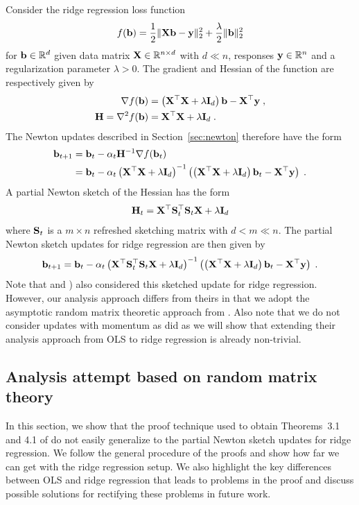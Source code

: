 Consider the ridge regression loss function
\[
f(\mathbf{b}) = \frac{1}{2}\|\mathbf{X}\mathbf{b}-\mathbf{y}\|_2^2 + \frac{\lambda}{2}\|\mathbf{b}\|_2^2
\]
for $\mathbf{b}\in\mathbb{R}^d$ given data matrix $\mathbf{X}\in\mathbb{R}^{n\times d}$ with $d\ll n$, responses $\mathbf{y}\in\mathbb{R}^n$ and a regularization parameter $\lambda>0$. The gradient and Hessian of the function are respectively given by
\begin{align*}
\nabla f(\mathbf{b}) &= \left(\mathbf{X}^\top\mathbf{X}+\lambda\mathbf{I}_d\right)\mathbf{b} - \mathbf{X}^\top\mathbf{y} \;, \\
\mathbf{H} = \nabla^2f(\mathbf{b}) &= \mathbf{X}^\top\mathbf{X}+\lambda\mathbf{I}_d \;.
\end{align*}
The Newton updates described in Section~\ref{sec:newton} therefore have the form
\begin{align*}
\mathbf{b}_{t+1} &= \mathbf{b}_t - \alpha_t\mathbf{H}^{-1}\nabla f(\mathbf{b}_t) \\
&= \mathbf{b}_t - \alpha_t\left(\mathbf{X}^\top\mathbf{X}+\lambda\mathbf{I}_d\right)^{-1}\left(\left(\mathbf{X}^\top\mathbf{X}+\lambda\mathbf{I}_d\right)\mathbf{b}_t-\mathbf{X}^\top\mathbf{y}\right) \;.
\end{align*}
A partial Newton sketch of the Hessian has the form
\[
\mathbf{H}_t = \mathbf{X}^\top\mathbf{S}_t^\top\mathbf{S}_t\mathbf{X} + \lambda\mathbf{I}_d
\]
where $\mathbf{S}_t$ is a $m\times n$ refreshed sketching matrix with $d<m\ll n$. The partial Newton sketch updates for ridge regression are then given by
\[
\mathbf{b}_{t+1} = \mathbf{b}_t - \alpha_t\left(\mathbf{X}^\top\mathbf{S}_t^\top\mathbf{S}_t\mathbf{X} + \lambda\mathbf{I}_d\right)^{-1}\left(\left(\mathbf{X}^\top\mathbf{X}+\lambda\mathbf{I}_d\right)\mathbf{b}_t-\mathbf{X}^\top\mathbf{y}\right) \;.
\]
Note that \citet{Chowdhury:2018} and \citet{Wang:2017}) also considered this sketched update for ridge regression. However, our analysis approach differs from theirs in that we adopt the asymptotic random matrix theoretic approach from \citet{Lacotte:2020}. Also note that we do not consider updates with momentum as \citet{Lacotte:2020} did as we will show that extending their analysis approach from OLS to ridge regression is already non-trivial.


\subsection{Analysis attempt based on random matrix theory} \label{sec:theory}

In this section, we show that the proof technique used to obtain Theorems~3.1 and 4.1 of \citep{Lacotte:2020} do not easily generalize to the partial Newton sketch updates for ridge regression. We follow the general procedure of the proofs and show how far we can get with the ridge regression setup. We also highlight the key differences between OLS and ridge regression that leads to problems in the proof and discuss possible solutions for rectifying these problems in future work.
\\

